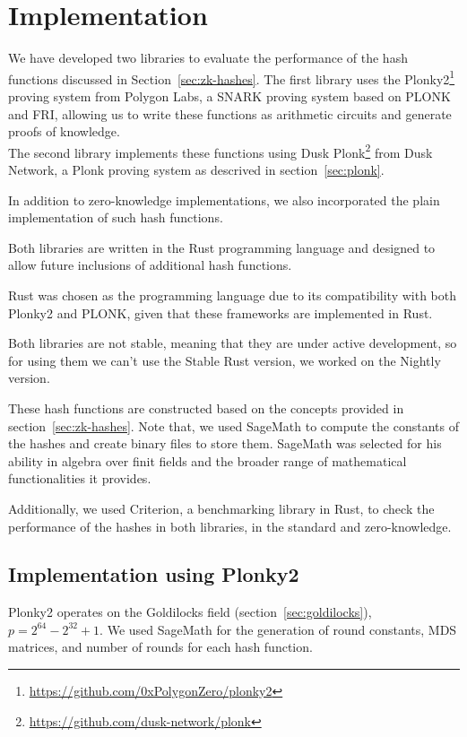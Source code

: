 \chapter{Implementation}
\label{sec:impl}
We have developed two libraries to evaluate the performance of the hash functions discussed in Section~\ref{sec:zk-hashes}. The first library uses the Plonky2\footnote{\url{https://github.com/0xPolygonZero/plonky2}} proving system from Polygon Labs, a SNARK proving system based on PLONK and FRI, allowing us to write these functions as arithmetic circuits and generate proofs of knowledge.\\
The second library implements these functions using Dusk Plonk\footnote{\url{https://github.com/dusk-network/plonk}} from Dusk Network, a Plonk proving system as descrived in section~\ref{sec:plonk}.

In addition to zero-knowledge implementations, we also incorporated the plain implementation of such hash functions.

Both libraries are written in the Rust programming language and designed to allow future inclusions of additional hash functions.

Rust was chosen as the programming language due to its compatibility with both Plonky2 and PLONK, given that these frameworks are implemented in Rust.

Both libraries are not stable, meaning that they are under active development, so for using them we can't use the Stable Rust version, we worked on the Nightly version.

These hash functions are constructed based on the concepts provided in section~\ref{sec:zk-hashes}. Note that, we used SageMath to compute the constants of the hashes and create binary files to store them. SageMath was selected for his ability in algebra over finit fields and the broader range of mathematical functionalities it provides.

Additionally, we used Criterion, a benchmarking library in Rust, to check the performance of the hashes in both libraries, in the standard and zero-knowledge.

\section{Implementation using Plonky2}
\label{sec:plonky-implementation}
Plonky2 operates on the Goldilocks field (section~\ref{sec:goldilocks}), $p=2^{64} - 2^{32} + 1$. We used SageMath for the generation of round constants, MDS matrices, and number of rounds for each hash function.

